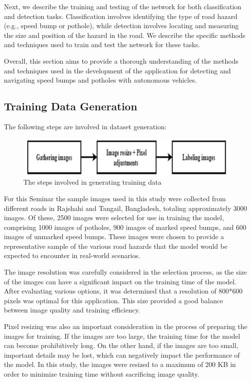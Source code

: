 \noindent
Next, we describe the training and testing of the network for both classification and detection tasks. Classification involves identifying the type of road hazard (e.g., speed bump or pothole), while detection involves locating and measuring the size and position of the hazard in the road. We describe the specific methods and techniques used to train and test the network for these tasks.

\noindent
Overall, this section aims to provide a thorough understanding of the methods and techniques used in the development of the application for detecting and navigating speed bumps and potholes with autonomous vehicles.
\subsection{Training Data Generation}
The following steps are involved in dataset generation:
\begin{figure}[h]
    \centering
    \includegraphics[scale=0.5]{Figures/chapter3/dataset_steps.png}
    \caption{The steps involved in generating training data}
    \label{fig:dataset_steps}
\end{figure}

\noindent
For this Seminar the sample images used in this study were collected from different roads in Rajshahi and Tangail, Bangladesh, totaling approximately 3000 images. Of these, 2500 images were selected for use in training the model, comprising 1000 images of potholes, 900 images of marked speed bumps, and 600 images of unmarked speed bumps. These images were chosen to provide a representative sample of the various road hazards that the model would be expected to encounter in real-world scenarios.

\noindent
The image resolution was carefully considered in the selection process, as the size of the images can have a significant impact on the training time of the model. After evaluating various options, it was determined that a resolution of 800*600 pixels was optimal for this application. This size provided a good balance between image quality and training efficiency.

\noindent
Pixel resizing was also an important consideration in the process of preparing the images for training. If the images are too large, the training time for the model can become prohibitively long. On the other hand, if the images are too small, important details may be lost, which can negatively impact the performance of the model. In this study, the images were resized to a maximum of 200 KB in order to minimize training time without sacrificing image quality.

